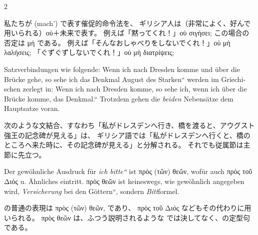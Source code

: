 \begin{paracol}{2}
\begin{enumerate}[leftmargin=0pt,rightmargin=0pt,listparindent =1cm,labelindent=1cm,labelsep=1ex,labelwidth={*},itemindent={*},align=left]
\begin{japanese}
私たちが  (mach')  で表す催促的命令法を、
ギリシア人は（非常によく、好んで用いられる）\textgreek[variant=ancient]{οὐ}＋未来で表す。
例えば「黙ってくれ！」\textgreek[variant=ancient]{οὐ σιγήσει;}
この場合の否定は \textgreek[variant=ancient]{μή} である。
例えば「そんなおしゃべりをしないでくれ！」\textgreek[variant=ancient]{οὐ μὴ λαλήσεις;}
「ぐずぐずしないでくれ！」\textgreek[variant=ancient]{οὐ μὴ διατρίψεις;}
\end{japanese}
\switchcolumn*

\begin{german}
\item Satzverbindungen wie folgende: \quotedblbase Wenn ich nach Dresden
komme und über die Brücke gehe, so sehe ich das Denkmal August des
Starken`` werden im Griechischen zerlegt in: \quotedblbase Wenn
ich nach Dresden komme, so sehe ich, wenn ich über die Brücke komme,
das Denkmal.`` Trotzdem gehen die \emph{beiden} Nebensätze dem Hauptsatze
voran. 
\end{german}
\switchcolumn

\begin{japanese}
次のような文結合、すなわち「私がドレスデンへ行き、橋を渡ると、アウグスト強王の記念碑が見える」は、
ギリシア語では「私がドレスデンへ行くと、橋のところへ来た時に、その記念碑が見える」と分解される。
それでも従属節は主節に先立つ。
\end{japanese}
\switchcolumn*

\begin{german}
\item Der gewöhnliche Ausdruck für \emph{\quotedblbase ich bitte``} ist
\textgreek[variant=ancient]{πρὸς (τῶν) θεῶν,} wofür auch \textgreek[variant=ancient]{πρὸς
τοῦ Διός} u. Ähnliches eintritt. \textgreek[variant=ancient]{πρὸς
θεῶν} ist keines\textcompwordmark{}wegs, wie gewöhnlich angegeben
wird, \emph{\quotedblbase Versicherung} bei den Göttern``, sondern
\emph{Bitt}formel.
\end{german}
\switchcolumn

\begin{japanese}
の普通の表現は
\textgreek[variant=ancient]{πρὸς (τῶν) θεῶν,} であり、
\textgreek[variant=ancient]{πρὸς τοῦ Διός} などもその代わりに用いられる。
\textgreek[variant=ancient]{πρὸς θεῶν} は、ふつう説明されるような
では決してなく、の定型句である。
\end{japanese}
\switchcolumn*


\end{enumerate}
\end{paracol}
